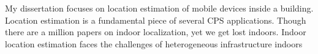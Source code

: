 \documentclass[10pt]{article}
\begin{document}
My dissertation focuses on location estimation of mobile devices inside a building. Location estimation is a fundamental piece of several CPS applications. Though there are a million papers on indoor localization, yet we get lost indoors. Indoor location estimation faces the challenges of heterogeneous infrastructure indoors 



\end{document}
